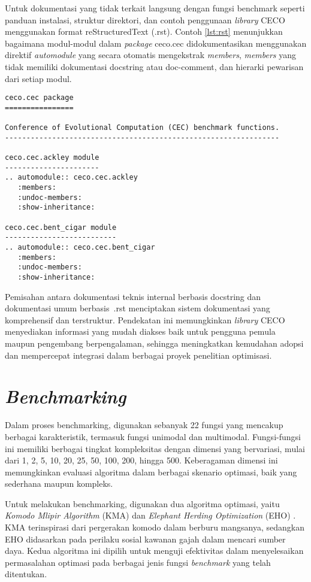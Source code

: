 Untuk dokumentasi yang tidak terkait langsung dengan fungsi benchmark seperti panduan instalasi, struktur direktori, dan contoh penggunaan \textit{library} CECO menggunakan format reStructuredText (.rst). Contoh \cref{lst:rst} menunjukkan bagaimana modul-modul dalam \textit{package} ceco.cec didokumentasikan menggunakan direktif \textit{automodule} yang secara otomatis mengekstrak \textit{members}, \textit{members} yang tidak memiliki dokumentasi docstring atau doc-comment, dan hierarki pewarisan dari setiap modul.
\begin{lstlisting}[caption=Dokumentasi dengan \textit{reStructuredText}, label=lst:rst]
ceco.cec package
================

Conference of Evolutional Computation (CEC) benchmark functions.
----------------------------------------------------------------

ceco.cec.ackley module
----------------------
.. automodule:: ceco.cec.ackley
   :members:
   :undoc-members:
   :show-inheritance:

ceco.cec.bent_cigar module
--------------------------
.. automodule:: ceco.cec.bent_cigar
   :members:
   :undoc-members:
   :show-inheritance:
\end{lstlisting}
Pemisahan antara dokumentasi teknis internal berbasis docstring dan dokumentasi umum berbasis\ .rst menciptakan sistem dokumentasi yang komprehensif dan terstruktur. Pendekatan ini memungkinkan \textit{library} CECO menyediakan informasi yang mudah diakses baik untuk pengguna pemula maupun pengembang berpengalaman, sehingga meningkatkan kemudahan adopsi dan mempercepat integrasi dalam berbagai proyek penelitian optimisasi.

\section{\textit{Benchmarking}}
Dalam proses benchmarking, digunakan sebanyak 22 fungsi yang mencakup berbagai karakteristik, termasuk fungsi unimodal dan multimodal. Fungsi-fungsi ini memiliki berbagai tingkat kompleksitas dengan dimensi yang bervariasi, mulai dari 1, 2, 5, 10, 20, 25, 50, 100, 200, hingga 500. Keberagaman dimensi ini memungkinkan evaluasi algoritma dalam berbagai skenario optimasi, baik yang sederhana maupun kompleks.

Untuk melakukan benchmarking, digunakan dua algoritma optimasi, yaitu \textit{Komodo Mlipir Algorithm} (KMA) \citep{Suyanto_2022} dan \textit{Elephant Herding Optimization} (EHO) \citep{Wang_2015}. KMA terinspirasi dari pergerakan komodo dalam berburu mangsanya, sedangkan EHO didasarkan pada perilaku sosial kawanan gajah dalam mencari sumber daya. Kedua algoritma ini dipilih untuk menguji efektivitas dalam menyelesaikan permasalahan optimasi pada berbagai jenis fungsi \textit{benchmark} yang telah ditentukan.

